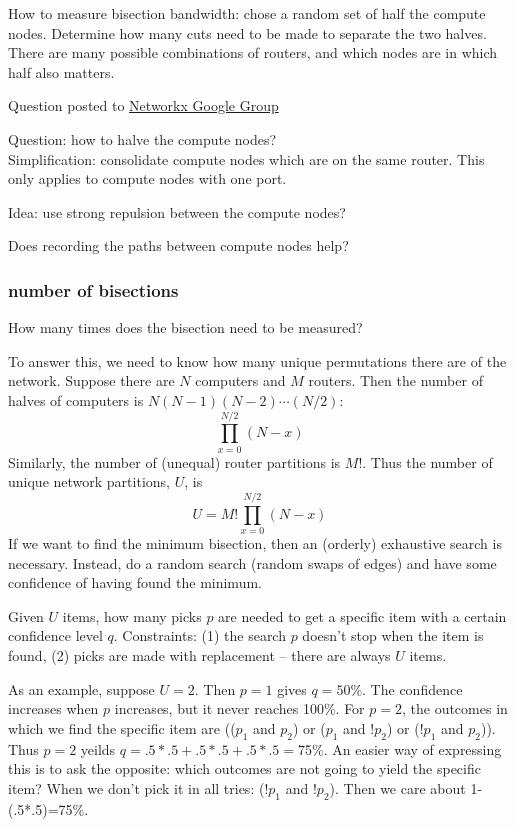 \documentclass[pdftex]{article}
\begin{document}
How to measure bisection bandwidth: chose a random set of half the compute nodes. Determine how many cuts need to be made to separate the two halves. There are many possible combinations of routers, and which nodes are in which half also matters.

Question posted to \href{https://groups.google.com/d/topic/networkx-discuss/hv_SzY-uaTw/discussion}{Networkx Google Group}

Question: how to halve the compute nodes?\\

Simplification: consolidate compute nodes which are on the same router. This only applies to compute nodes with one port.

Idea: use strong repulsion between the compute nodes?

Does recording the paths between compute nodes help?

\subsubsection{number of bisections}
How many times does the bisection need to be measured?

To answer this, we need to know how many unique permutations there are of the network. Suppose there are $N$ computers and $M$ routers. Then the number of halves of computers is $N(N-1)(N-2)\cdots(N/2)$:
\begin{equation}
 \prod_{x=0}^{N/2}(N-x)
\end{equation}
Similarly, the number of (unequal) router partitions is $M!$. Thus the number of unique network partitions, $U$, is
\begin{equation}
 U = M! \prod_{x=0}^{N/2}(N-x)
\end{equation}
If we want to find the minimum bisection, then an (orderly) exhaustive search is necessary. Instead, do a random search (random swaps of edges) and have some confidence of having found the minimum.

Given $U$ items, how many picks $p$ are needed to get a specific item with a certain confidence level $q$. Constraints: (1) the search $p$ doesn't stop when the item is found, (2) picks are made with replacement -- there are always $U$ items.

As an example, suppose $U=2$. Then $p=1$ gives $q=50\%$. The confidence increases when $p$ increases, but it never reaches 100\%. For $p=2$, the outcomes in which we find the specific item are
 (($p_1$ and $p_2$) or ($p_1$ and $!p_2$) or ($!p_1$ and $p_2$)). Thus $p=2$ yeilds $q=.5*.5+.5*.5+.5*.5=$75\%. An easier way of expressing this is to ask the opposite: which outcomes are not going to yield the specific item? When we don't pick it in all tries: ($!p_1$ and $!p_2$). Then we care about 1-(.5*.5)=75\%.
\end{document}

